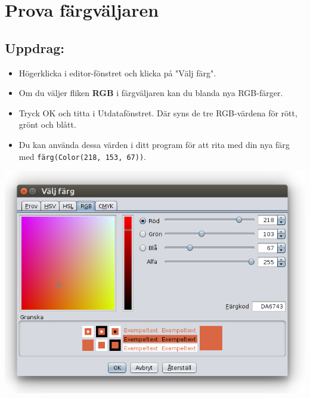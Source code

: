 \chapter{Prova färgväljaren}
\begin{multicols}{2}
\section*{\color{BrickRed}Uppdrag:}


\begin{itemize}

\item {Högerklicka i editor-fönstret och klicka på "Välj färg".}
\item {Om du väljer fliken {\bf RGB} i färgväljaren kan du blanda nya RGB-färger.}
\item {Tryck OK och titta i Utdatafönstret. Där syns de tre RGB-värdena för rött, grönt och blått.}
\item {Du kan använda dessa värden i ditt program för att rita med din nya färg med \lstinline{färg(Color(218, 153, 67))}.}

\end{itemize}



\columnbreak

\begin{center}
\includegraphics[width=14.0cm]{../img/color-chooser-rgb-sv.png}
\end{center}

\end{multicols}

